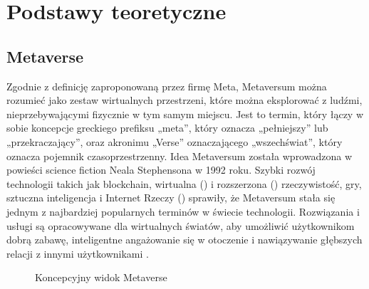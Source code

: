 
\chapter{Podstawy teoretyczne}
\section{Metaverse}


Zgodnie z definicję zaproponowaną przez firmę Meta, Metaversum można rozumieć jako zestaw wirtualnych przestrzeni, które można eksplorować z ludźmi, nieprzebywającymi fizycznie w tym samym miejscu\cite{metaverseMetaDef}\cite{metaverseDefinitionReview}. Jest to termin, który łączy w sobie koncepcje greckiego prefiksu „meta”, który oznacza „pełniejszy” lub „przekraczający”, oraz akronimu „Verse” oznaczającego „wszechświat”, który oznacza pojemnik czasoprzestrzenny. Idea Metaversum została wprowadzona w powieści science fiction Neala Stephensona  w 1992 roku. Szybki rozwój technologii takich jak blockchain, wirtualna () i rozszerzona () rzeczywistość, gry, sztuczna inteligencja i Internet Rzeczy  () sprawiły, że Metaversum stała się jednym z najbardziej popularnych terminów w świecie technologii. Rozwiązania i usługi są opracowywane dla wirtualnych światów, aby umożliwić użytkownikom dobrą zabawę, inteligentne angażowanie się w otoczenie i nawiązywanie głębszych relacji z innymi użytkownikami \cite{metaverseAsAService}. 

\begin{figure}[htbp!]
    \centering
    
    \caption{Koncepcyjny widok Metaverse\cite{metaverseUseCaseslee}}
    \label{fig:enter-label}
\end{figure}

